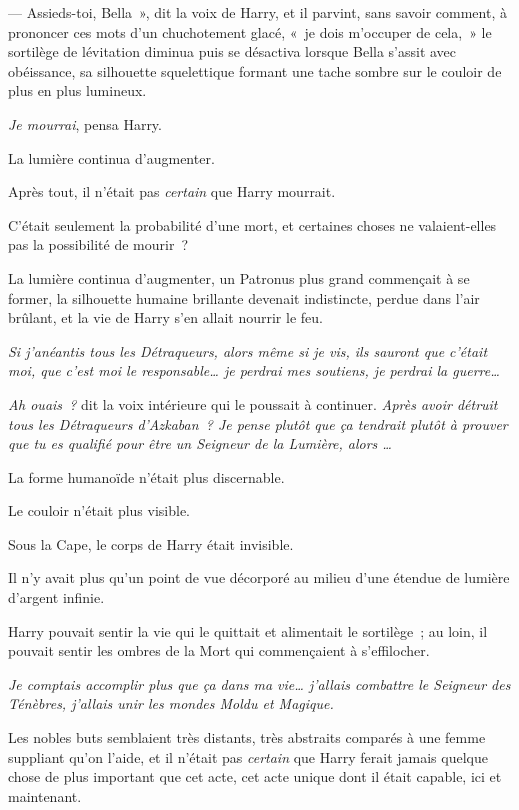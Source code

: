 --- Assieds-toi, Bella~», dit la voix de Harry, et il parvint, sans savoir comment, à prononcer ces mots d'un chuchotement glacé, «~je dois m'occuper de cela,~» le sortilège de lévitation diminua puis se désactiva lorsque Bella s'assit avec obéissance, sa silhouette squelettique formant une tache sombre sur le couloir de plus en plus lumineux.

\emph{Je mourrai}, pensa Harry.

La lumière continua d'augmenter.

Après tout, il n'était pas \emph{certain} que Harry mourrait.

C'était seulement la probabilité d'une mort, et certaines choses ne valaient-elles pas la possibilité de mourir~?

La lumière continua d'augmenter, un Patronus plus grand commençait à se former, la silhouette humaine brillante devenait indistincte, perdue dans l'air brûlant, et la vie de Harry s'en allait nourrir le feu.

\emph{Si j'anéantis tous les Détraqueurs, alors même si je vis, ils sauront que c'était moi, que c'est moi le responsable… je perdrai mes soutiens, je perdrai la guerre…}

\emph{Ah ouais~?} dit la voix intérieure qui le poussait à continuer. \emph{Après avoir détruit tous les Détraqueurs d'Azkaban~? Je pense plutôt que ça tendrait plutôt à prouver que tu es qualifié pour être un Seigneur de la Lumière, alors …}

La forme humanoïde n'était plus discernable.

Le couloir n'était plus visible.

Sous la Cape, le corps de Harry était invisible.

Il n'y avait plus qu'un point de vue décorporé au milieu d'une étendue de lumière d'argent infinie.

Harry pouvait sentir la vie qui le quittait et alimentait le sortilège~; au loin, il pouvait sentir les ombres de la Mort qui commençaient à s'effilocher.

\emph{Je comptais accomplir plus que ça dans ma vie… j'allais combattre le Seigneur des Ténèbres, j'allais unir les mondes Moldu et Magique.}

Les nobles buts semblaient très distants, très abstraits comparés à une femme suppliant qu'on l'aide, et il n'était pas \emph{certain} que Harry ferait jamais quelque chose de plus important que cet acte, cet acte unique dont il était capable, ici et maintenant.


